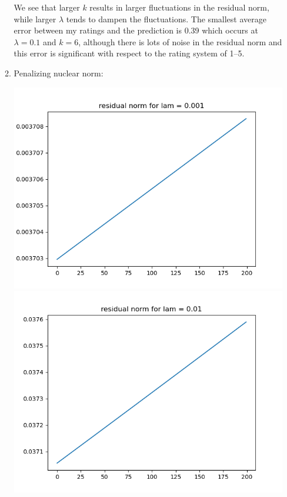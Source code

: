 \documentclass{article}
\begin{document}
\begin{enumerate}
\begin{enumerate}
		We see that larger $k$ results in larger fluctuations in the residual norm, while larger $\lambda$ tends to dampen the fluctuations. The smallest average error between my ratings and the prediction is 0.39 which occurs at $\lambda=0.1$ and $k=6$, although there is lots of noise in the residual norm and this error is significant with respect to the rating system of 1--5.
		
		
		
		\pagebreak
		
		
		
		\item Penalizing nuclear norm:
		
		\begin{center}
			\includegraphics[scale=.3]{hw7p1b residual norm for lamcount = 1}
			\includegraphics[scale=.3]{hw7p1b residual norm for lamcount = 2}

\end{center}
\end{enumerate}
\end{enumerate}
\end{document}
